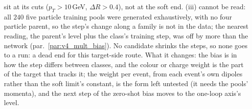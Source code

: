 \documentclass[11pt]{article}
\begin{document}
sit at its cuts ($p_T>10$\,GeV, $\Delta R>0.4$), not at the soft end. (iii) cannot be read: all $240$ five particle
training pools were generated exhaustively, with no four particle parent, so the step's change along a family is not
in the data; the nearest reading, the parent's level plus the class's training step, was off by more than the network
(par.~\ref{par:v4_mult_bias}). No candidate shrinks the steps, so none goes to a run: a dead end for this target-side
route. What it changes: the bias is in how the step differs between classes, and the colour or charge weight is the part
of the target that tracks it; the weight per event, from each event's own dipoles rather than the soft limit's
constant, is the form left untested (it needs the pools' momenta), and the next step of the zero-shot bias moves to
the one-loop axis's level.

\end{document}
